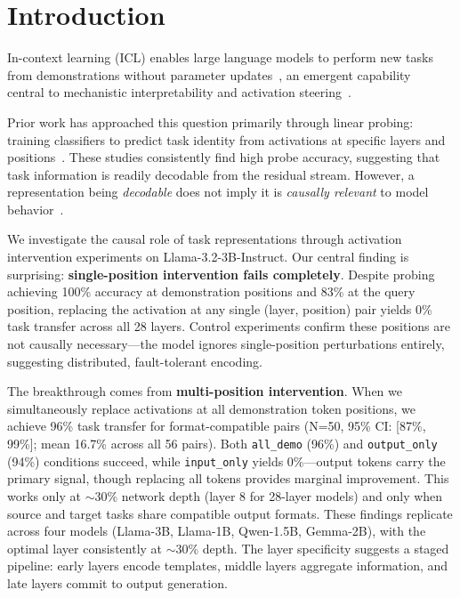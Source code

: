 \documentclass[runningheads]{llncs}
\begin{document}
\section{Introduction}
\label{sec:intro}

In-context learning (ICL) enables large language models to perform new tasks from demonstrations without parameter updates~\cite{brown2020language,garg2022can}, an emergent capability~\cite{wei2022emergent} central to mechanistic interpretability and activation steering~\cite{turner2023activation}.

Prior work has approached this question primarily through linear probing: training classifiers to predict task identity from activations at specific layers and positions~\cite{todd2023function,hendel2023context}. These studies consistently find high probe accuracy, suggesting that task information is readily decodable from the residual stream. However, a representation being \emph{decodable} does not imply it is \emph{causally relevant} to model behavior~\cite{ravfogel2020null,elazar2021amnesic}.

We investigate the causal role of task representations through activation intervention experiments on Llama-3.2-3B-Instruct. Our central finding is surprising: \textbf{single-position intervention fails completely}. Despite probing achieving 100\% accuracy at demonstration positions and 83\% at the query position, replacing the activation at any single (layer, position) pair yields 0\% task transfer across all 28 layers. Control experiments confirm these positions are not causally necessary---the model ignores single-position perturbations entirely, suggesting distributed, fault-tolerant encoding.

The breakthrough comes from \textbf{multi-position intervention}. When we simultaneously replace activations at all demonstration token positions, we achieve 96\% task transfer for format-compatible pairs (N=50, 95\% CI: [87\%, 99\%]; mean 16.7\% across all 56 pairs). Both \texttt{all\_demo} (96\%) and \texttt{output\_only} (94\%) conditions succeed, while \texttt{input\_only} yields 0\%---output tokens carry the primary signal, though replacing all tokens provides marginal improvement. This works only at $\sim$30\% network depth (layer 8 for 28-layer models) and only when source and target tasks share compatible output formats. These findings replicate across four models (Llama-3B, Llama-1B, Qwen-1.5B, Gemma-2B), with the optimal layer consistently at $\sim$30\% depth. The layer specificity suggests a staged pipeline: early layers encode templates, middle layers aggregate information, and late layers commit to output generation.
\end{document}
